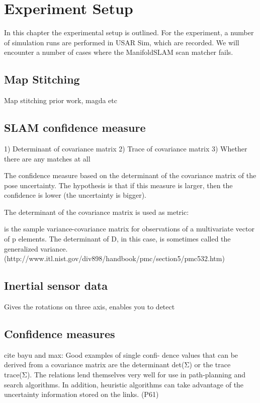 \chapter{Experiment Setup}
In this chapter the experimental setup is outlined. For the experiment, a number of simulation runs are performed in USAR Sim, which are recorded. We will encounter a number of cases where the ManifoldSLAM scan matcher fails. 

\section{Map Stitching}
Map stitching prior work, magda etc

\section{SLAM confidence measure}
1) Determinant of covariance matrix
2) Trace of covariance matrix
3) Whether there are any matches at all



The confidence measure based on the determinant of the covariance matrix of the pose uncertainty. The hypothesis is that if this measure is larger, then the confidence is lower (the uncertainty is bigger).

The determinant of the covariance matrix is used as metric:

is the sample variance-covariance matrix for observations of a multivariate vector of p elements. The determinant of D, in this case, is sometimes called the generalized variance. (http://www.itl.nist.gov/div898/handbook/pmc/section5/pmc532.htm)

\section{Inertial sensor data}
Gives the rotations on three axis, enables you to detect 

\section{Confidence measures}
cite bayu and max:     Good examples of single confi- dence values that can be derived from a covariance matrix are the determinant det(Σ) or the trace trace(Σ). The relations lend themselves very well for use in path-planning and search algorithms. In addition, heuristic algorithms can take advantage of the uncertainty information stored on the links. (P61)




